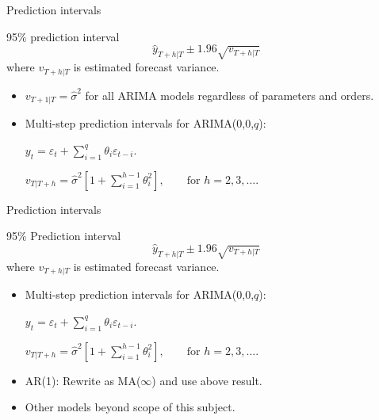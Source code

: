 \documentclass[14pt,ignorenonframetext,]{beamer}
\providecommand{\tightlist}{%
  \setlength{\itemsep}{0pt}\setlength{\parskip}{0pt}}
\begin{document}
\begin{frame}{Prediction intervals}

\begin{block}{95\% prediction interval}
$$\hat{y}_{T+h|T} \pm 1.96\sqrt{v_{T+h|T}}$$
where $v_{T+h|T}$ is estimated forecast variance.
\end{block}

\pause

\begin{itemize}
\tightlist
\item
  \(v_{T+1|T}=\hat{\sigma}^2\) for all ARIMA models regardless of
  parameters and orders.
\item
  Multi-step prediction intervals for ARIMA(0,0,\(q\)):
  \centerline{$\displaystyle y_t = \varepsilon_t + \sum_{i=1}^q \theta_i \varepsilon_{t-i}.$}
  \centerline{$\displaystyle
  v_{T|T+h} = \hat{\sigma}^2 \left[ 1 + \sum_{i=1}^{h-1} \theta_i^2\right], \qquad\text{for~} h=2,3,\dots.$}
\end{itemize}

\end{frame}

\begin{frame}{Prediction intervals}

\begin{block}{95\% Prediction interval}
$$\hat{y}_{T+h|T} \pm 1.96\sqrt{v_{T+h|T}}$$
where $v_{T+h|T}$ is estimated forecast variance.
\end{block}

\begin{itemize}
\tightlist
\item
  Multi-step prediction intervals for ARIMA(0,0,\(q\)):
  \centerline{$\displaystyle y_t = \varepsilon_t + \sum_{i=1}^q \theta_i \varepsilon_{t-i}.$}
  \centerline{$\displaystyle
  v_{T|T+h} = \hat{\sigma}^2 \left[ 1 + \sum_{i=1}^{h-1} \theta_i^2\right], \qquad\text{for~} h=2,3,\dots.$}
\end{itemize}

\pause

\begin{itemize}
\tightlist
\item
  AR(1): Rewrite as MA(\(\infty\)) and use above result.
\item
  Other models beyond scope of this subject.
\end{itemize}

\end{frame}
\end{document}
